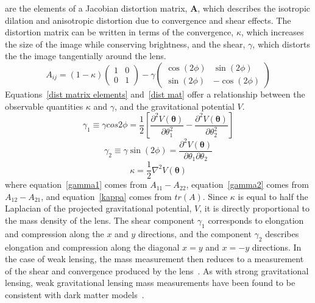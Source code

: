 are the elements of a Jacobian distortion matrix, $\mathbf{A}$, which describes the isotropic dilation and anisotropic distortion due to convergence and shear effects.  The distortion matrix can be written in terms of the convergence, $\kappa$, which increases the size of the image while conserving brightness, and the shear, $\gamma$, which distorts the the image tangentially around the lens.  
\begin{equation} \label{dist mat}
A_{ij}=(1-\kappa) \left(\begin{matrix} 1 & 0 \\ 0 & 1 \end{matrix} \right) - \gamma \left(\begin{matrix} \cos(2\phi) & \sin(2\phi) \\ \sin(2\phi) & -\cos(2\phi) \end{matrix} \right) 
\end{equation}
Equations~\ref{dist matrix elements} and~\ref{dist mat} offer a relationship between the observable quantities $\kappa$ and $\gamma$, and the gravitational potential $V$.
\begin{equation} \label{gamma1}
\gamma_1 \equiv \gamma cos 2\phi= \frac{1}{2} \left[\frac{ \partial ^2 V(\boldsymbol{\theta})}{\partial \theta_1^2} - \frac{ \partial^2 V(\boldsymbol{\theta})}{\partial \theta_2^2} \right]
\end{equation}
\begin{equation} \label{gamma2}
\gamma_2 \equiv \gamma \sin (2\phi) = \frac{ \partial^2 V(\boldsymbol{\theta})}{\partial \theta_1 \partial \theta_2}
\end{equation}
\begin{equation} \label{kappa}
\kappa = \frac{1}{2} \nabla^2 V(\boldsymbol{\theta})
\end{equation}
where equation~\ref{gamma1} comes from $A_{11}-A_{22}$, equation~\ref{gamma2} comes from $A_{12}-A_{21}$, and equation~\ref{kappa} comes from $tr(A)$.  Since $\kappa$ is equal to half the Laplacian of the projected gravitational potential, $V$, it is directly proportional to the mass density of the lens.  The shear component $\gamma_1$ corresponds to elongation and compression along the $x$ and $y$ directions, and the component $\gamma_2$ describes elongation and compression along the diagonal $x=y$ and $x=-y$ directions.  In the case of weak lensing, the mass measurement then reduces to a measurement of the shear and convergence produced by the lens~\cite{Pires}. As with strong gravitational lensing, weak gravitational lensing mass measurements have been found to be consistent with dark matter models~\cite{Wu}.


